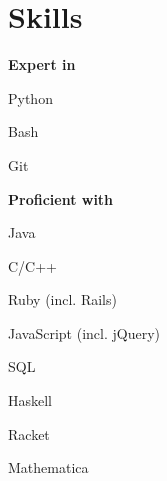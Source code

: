 \sectionsep
\section{Skills}
\textbf{Expert in}
\vspace{\topsep} %
\begin{tightemize}
\item Python
\item Bash
\item Git
\end{tightemize}
\sectionsep

\textbf{Proficient with}
\begin{tightemize}
\item Java
\item C/C++
\item Ruby (incl. Rails)
\item JavaScript (incl. jQuery)
\item SQL
\item Haskell
\item Racket
\item Mathematica
\end{tightemize}
\sectionsep
